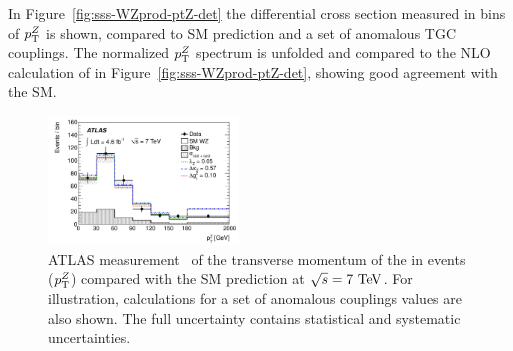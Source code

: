 \begin{table}[htp]
\begin{center}
\caption{Summary of measured fiducial and total $\WZ$ production cross sections from ATLAS 
at 7 TeV center-of-mass energies in the $\ll\lnu$ final state. The fiducial definitions differ from the 7 and 8 TeV analysis. Furthermore, the 7 TeV analysis
quotes the sum for the $e$ and $\mu$ channels, the 8 TeV analysis quotes the combination of channels. Thus, the two fiducial cross sections cannot be 
compared directly.}
\end{center}
\label{tab:sss-WZprod-xsec}
\end{table}%


In Figure~\ref{fig:sss-WZprod-ptZ-det} the differential cross section measured in bins of 
$p_{\mathrm{T}}^Z$ is shown, compared to SM prediction and a set of anomalous TGC couplings. 
The normalized $p_{\mathrm{T}}^Z$ spectrum is unfolded and compared to the NLO calculation of \mcatnlo in 
Figure~\ref{fig:sss-WZprod-ptZ-det}, showing good agreement with the SM.


\begin{figure}[htbp]
  \begin{center}
  \includegraphics[width=0.45\textwidth]{figures/sss-inclboson-diboson-wzprod-ptZ-det.pdf}
  \caption{ATLAS measurement~\cite{Aad:2012twa} of the transverse momentum of the \Zboson in \WZ events ($p_{\mathrm{T}}^Z$) compared with the SM prediction at $\rts = 7\TeV$. For illustration, calculations for a set of anomalous couplings values are also shown. The full uncertainty contains statistical and systematic uncertainties.}
\label{fig:sss-WZprod-ptZ}
\end{center}
\end{figure}

